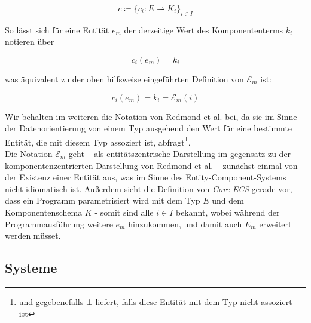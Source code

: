 \[
    c \coloneqq \{c_i : E \rightharpoonup K_i\}_{i \in I}
\]

\noindent
So lässt sich für eine Entität $e_m$ der derzeitige Wert des Komponententerms $k_i$ notieren über

\[
  c_i(e_m) = k_i
\]

\noindent
was äquivalent zu der oben hilfsweise eingeführten Definition von $\mathcal{E}_m$ ist:

\[
    c_i(e_m) = k_i = \mathcal{E}_m(i)
\]

\noindent
Wir behalten im weiteren die Notation von Redmond et {al.} bei, da sie im Sinne der Datenorientierung von einem Typ ausgehend den Wert für eine bestimmte Entität, die mit diesem Typ assoziert ist, abfragt\footnote{
    und gegebenefalls $\bot$ liefert, falls diese Entität mit dem Typ nicht assoziert ist
}.\\
Die Notation $\mathcal{E}_{m}$ geht -- als entitätszentrische Darstellung im gegensatz zu der komponentenzentrierten Darstellung von Redmond et al. -- zunächst einmal von der Existenz einer Entität aus, was im Sinne des Entity-Component-Systems nicht idiomatisch ist.
Außerdem sieht die Definition von \textit{Core ECS} gerade vor, dass ein Programm parametrisiert wird mit dem Typ $E$ und dem Komponentenschema $K$ - somit sind alle $i \in I$ bekannt, wobei während der Programmausführung weitere $e_m$ hinzukommen, und damit auch $E_m$ erweitert werden müsset.


\subsection{Systeme}